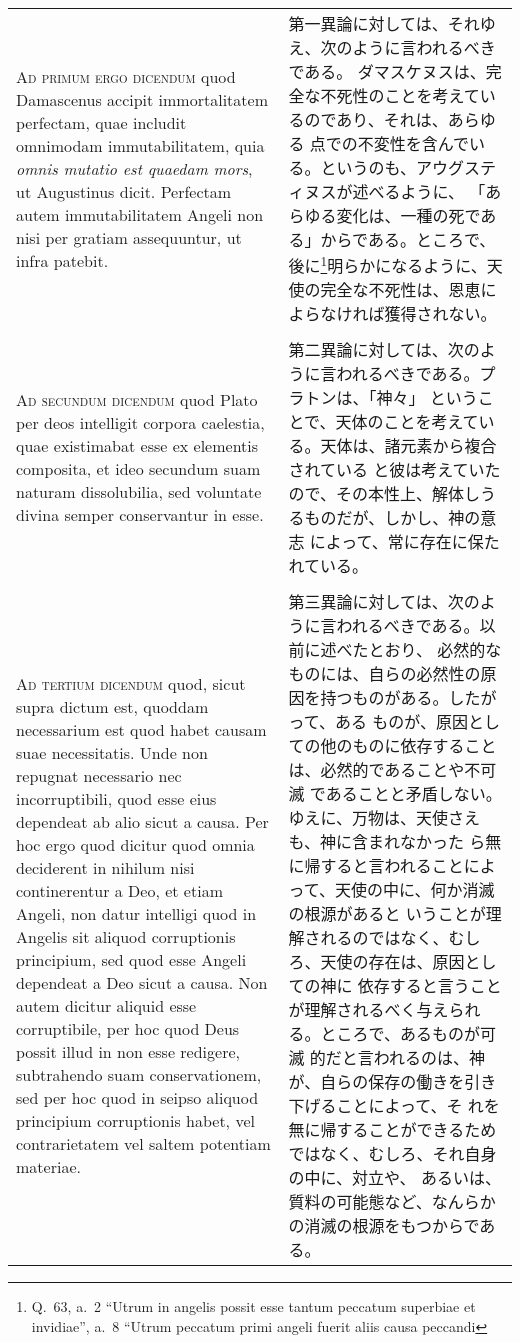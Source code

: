 \documentclass[10pt]{jsarticle} %
\begin{document}
\begin{longtable}{p{21em}p{21em}}
{\scshape Ad primum ergo dicendum} quod Damascenus accipit
immortalitatem perfectam, quae includit omnimodam immutabilitatem, quia
{\itshape omnis mutatio est quaedam mors}, ut Augustinus
dicit. Perfectam autem immutabilitatem Angeli non nisi per gratiam
assequuntur, ut infra patebit.

&

第一異論に対しては、それゆえ、次のように言われるべきである。
ダマスケヌスは、完全な不死性のことを考えているのであり、それは、あらゆる
点での不変性を含んでいる。というのも、アウグスティヌスが述べるように、
「あらゆる変化は、一種の死である」からである。ところで、後に\footnote{
Q.~63, a.~2 ``Utrum in angelis possit esse tantum peccatum superbiae et
 invidiae'', a.~8 ``Utrum peccatum primi angeli fuerit aliis causa peccandi
}明らかになるように、天使の完全な不死性は、恩恵によらなければ獲得されない。

\\\\


{\scshape Ad secundum dicendum} quod Plato per deos
intelligit corpora caelestia, quae existimabat esse ex elementis
composita, et ideo secundum suam naturam dissolubilia, sed voluntate
divina semper conservantur in esse.


&

第二異論に対しては、次のように言われるべきである。プラトンは、「神々」
ということで、天体のことを考えている。天体は、諸元素から複合されている
と彼は考えていたので、その本性上、解体しうるものだが、しかし、神の意志
によって、常に存在に保たれている。

\\\\


{\scshape Ad tertium dicendum} quod, sicut supra dictum est, quoddam
necessarium est quod habet causam suae necessitatis. Unde non repugnat
necessario nec incorruptibili, quod esse eius dependeat ab alio sicut
a causa. Per hoc ergo quod dicitur quod omnia deciderent in nihilum
nisi continerentur a Deo, et etiam Angeli, non datur intelligi quod in
Angelis sit aliquod corruptionis principium, sed quod esse Angeli
dependeat a Deo sicut a causa. Non autem dicitur aliquid esse
corruptibile, per hoc quod Deus possit illud in non esse redigere,
subtrahendo suam conservationem, sed per hoc quod in seipso aliquod
principium corruptionis habet, vel contrarietatem vel saltem potentiam
materiae.


 &
 
第三異論に対しては、次のように言われるべきである。以前に述べたとおり、
必然的なものには、自らの必然性の原因を持つものがある。したがって、ある
ものが、原因としての他のものに依存することは、必然的であることや不可滅
であることと矛盾しない。ゆえに、万物は、天使さえも、神に含まれなかった
ら無に帰すると言われることによって、天使の中に、何か消滅の根源があると
いうことが理解されるのではなく、むしろ、天使の存在は、原因としての神に
依存すると言うことが理解されるべく与えられる。ところで、あるものが可滅
的だと言われるのは、神が、自らの保存の働きを引き下げることによって、そ
れを無に帰することができるためではなく、むしろ、それ自身の中に、対立や、
あるいは、質料の可能態など、なんらかの消滅の根源をもつからである。

\end{longtable}
\end{document}
